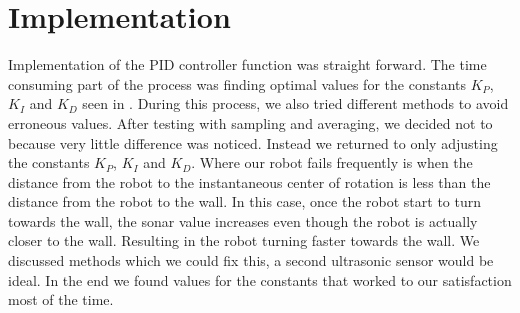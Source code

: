 \section{Implementation}\label{section_implementation}
Implementation of the PID controller function was straight forward. The time consuming part of the process was finding optimal values for the constants $K_{P}$, $K_{I}$ and $K_{D}$ seen in . During this process, we also tried different methods to avoid erroneous values. After testing with sampling and averaging, we decided not to because very little difference was noticed. Instead we returned to only adjusting the constants $K_{P}$, $K_{I}$ and $K_{D}$. Where our robot fails frequently is when the distance from the robot to the instantaneous center of rotation is less than the distance from the robot to the wall. In this case, once the robot start to turn towards the wall, the sonar value increases even though the robot is actually closer to the wall. Resulting in the robot turning faster towards the wall. We discussed methods which we could fix this, a second ultrasonic sensor would be ideal. In the end we found values for the constants that worked to our satisfaction most of the time. 
